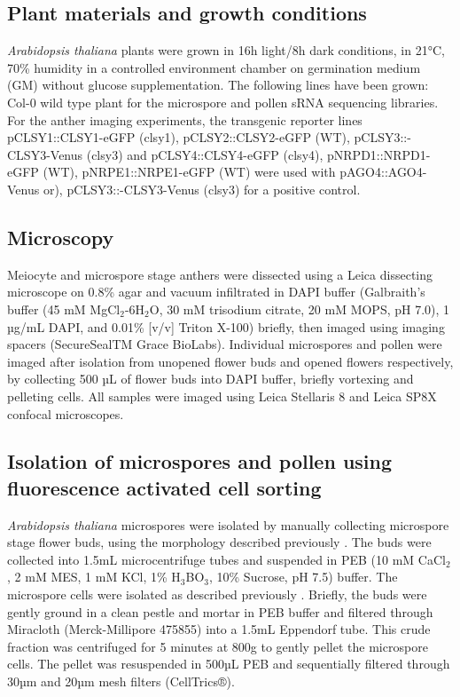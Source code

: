 \subsection{Plant materials and growth conditions}

\textit{Arabidopsis thaliana} plants were grown in 16h light/8h dark conditions, in 21°C, 70\% humidity in a controlled environment chamber on germination medium (GM) without glucose supplementation. The following lines have been grown: Col-0 wild type plant for the microspore and pollen sRNA sequencing libraries. For the anther imaging experiments, the transgenic reporter lines pCLSY1::CLSY1-eGFP (clsy1), pCLSY2::CLSY2-eGFP (WT), pCLSY3::-CLSY3-Venus (clsy3) and pCLSY4::CLSY4-eGFP (clsy4), pNRPD1::NRPD1-eGFP (WT), pNRPE1::NRPE1-eGFP (WT) were used with pAGO4::AGO4-Venus or), pCLSY3::-CLSY3-Venus (clsy3) for a positive control.

\subsection{Microscopy}

Meiocyte and microspore stage anthers were dissected using a Leica dissecting microscope on 0.8\% agar and vacuum infiltrated in DAPI buffer (Galbraith’s buffer (45 mM MgCl$_2$-6H$_2$O, 30 mM trisodium citrate, 20 mM MOPS, pH 7.0), 1 µg/mL DAPI, and 0.01\% [v/v] Triton X-100) briefly, then imaged using imaging spacers (SecureSealTM Grace BioLabs). Individual microspores and pollen were imaged after isolation from unopened flower buds and opened flowers respectively, by collecting 500 µL of flower buds into DAPI buffer, briefly vortexing and pelleting cells. All samples were imaged using Leica Stellaris 8 and Leica SP8X confocal microscopes.

\subsection{Isolation of microspores and pollen using fluorescence activated cell sorting}

\textit{Arabidopsis thaliana} microspores were isolated by manually collecting microspore stage flower buds, using the morphology described previously \cite{RN86}. The buds were collected into 1.5mL microcentrifuge tubes and suspended in PEB (10 mM CaCl$_2$, 2 mM MES, 1 mM KCl, 1\% H$_3$BO$_3$, 10\% Sucrose, pH 7.5) buffer. The microspore cells were isolated as described previously \cite{RN140}. Briefly, the buds were gently ground in a clean pestle and mortar in PEB buffer and filtered through Miracloth (Merck-Millipore 475855) into a 1.5mL Eppendorf tube. This crude fraction was centrifuged for 5 minutes at 800g to gently pellet the microspore cells. The pellet was resuspended in 500µL PEB and sequentially filtered through 30µm and 20µm mesh filters (CellTrics®).

